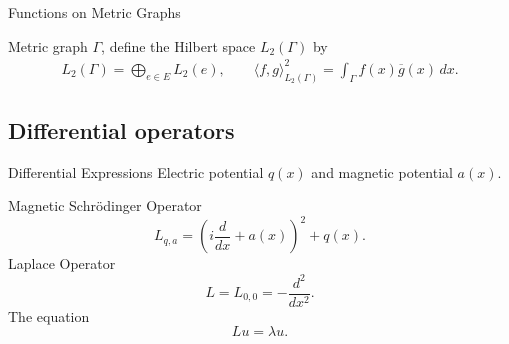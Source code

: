 \documentclass{beamer}
\newcommand{\norm}[1]{\left\lVert#1\right\rVert}
\newcommand{\abs}[1]{\left\lvert#1\right\rvert}
\newcommand{\ip}[2]{\ensuremath{\langle #1, #2 \rangle}}
\begin{document}
  \begin{frame}{Functions on Metric Graphs}
    \begin{definition}
      Metric graph $\Gamma$, define the Hilbert space $L_2(\Gamma)$ by
      \begin{align*}
        L_2(\Gamma) = \bigoplus_{e \in E} L_2(e), \quad\quad
        \ip{f}{g}_{L_2(\Gamma)}^2 = \int_\Gamma f(x)\overline{g}(x)\,dx.
      \end{align*}
    \end{definition}
  \end{frame}


  \subsection{Differential operators}

  \begin{frame}{Differential Expressions}
    Electric potential $q(x)$ and magnetic potential $a(x)$.

    Magnetic Schrödinger Operator
    \begin{equation*}
      L_{q,a} = \left(i\frac{d}{dx} + a(x)\right)^2 + q(x).
    \end{equation*}
    \pause
    Laplace Operator
    \begin{equation*}
      L = L_{0,0} = -\frac{d^2}{dx^2}.
    \end{equation*}
    \pause
    The equation
    \[
      Lu = \lambda u.
    \]
  \end{frame}
\end{document}
